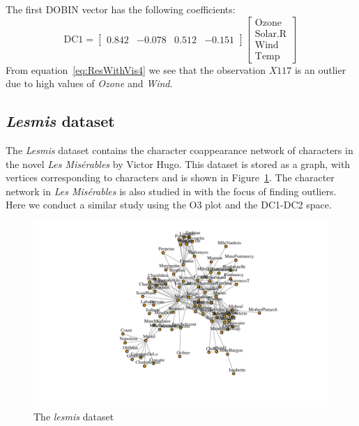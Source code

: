 \documentclass[11pt]{article}
\begin{document}
\noindent
The first DOBIN vector has the following coefficients:
\begin{equation}\label{eq:ResWithVis4}
    \text{DC1} = \begin{bmatrix}
    0.842 & -0.078 &  0.512 & -0.151   
    \end{bmatrix}
    \begin{bmatrix}
    \text{Ozone} \\
    \text{Solar.R} \\
    \text{Wind} \\
    \text{Temp} 
    \end{bmatrix} \, 
\end{equation}
From equation~\eqref{eq:ResWithVis4} we see that the observation $X117$ is an outlier due to high values of \textit{Ozone} and \textit{Wind}. 

\subsection{\textit{Lesmis} dataset}\label{sec:ResWithVis5}
The \textit{Lesmis} dataset \citep{sombrero} contains the character coappearance network of characters in the novel \textit{Les Mis\'erables} by Victor Hugo. This dataset is stored as a graph, with vertices corresponding to characters and is shown in Figure~\ref{fig:lesmisgraph}. The character network in \textit{Les Mis\'erables} is also studied in \cite{wilkinson2017visualizing} with the focus of finding outliers. Here we conduct a similar study using the O3 plot and the DC1-DC2 space. \\

\begin{figure}[!ht]
	\centering
	\includegraphics{lesmis.pdf}
	\caption{The \textit{lesmis} dataset }
	\label{fig:lesmisgraph}
\end{figure}
\end{document}

